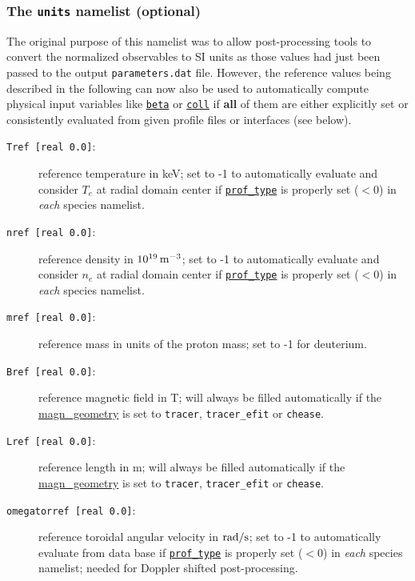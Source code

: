 \documentclass[12pt]{article}
\begin{document}
\subsubsection{{The \texttt{units} namelist (optional)}}\label{sec:units_nml}
\hypertarget{units_nml}{}
The original purpose of this namelist was to allow post-processing tools to convert the normalized observables
to SI units as those values had just been passed to the output \texttt{parameters.dat} file.
However, the reference values being described in the following can now also be used to automatically
compute physical input variables like \hyperlink{beta}{\tt beta} or \hyperlink{coll}{\tt coll} if {\bf all} of them
are either explicitly set or consistently evaluated from given profile files or interfaces (see below).
\begin{description}
\item[\texttt{Tref [real 0.0]}:] reference temperature in keV; set to -1 to automatically evaluate and consider $T_e$
at radial domain center if \hyperlink{prof_type}{\tt prof\_type} is properly set ($<0$) in {\em each} species namelist.
\item[\texttt{nref [real 0.0]}:] reference density in $10^{19}\,{\rm m}^{-3}$; set to -1 to automatically evaluate and
consider $n_e$ at radial domain center if \hyperlink{prof_type}{\tt prof\_type} is properly set ($<0$) in {\em each} species namelist.
\item[\texttt{mref [real 0.0]}:] reference mass in units of the proton mass; set to -1 for deuterium.
\item[\texttt{Bref [real 0.0]}:] reference magnetic field in T; will always be filled automatically if the
\hyperlink{magn_geometry}{magn\_geometry} is set to \texttt{tracer}, \texttt{tracer\_efit} or \texttt{chease}.
\item[\texttt{Lref [real 0.0]}:] reference length in m; will always be filled automatically if the
\hyperlink{magn_geometry}{magn\_geometry} is set to \texttt{tracer}, \texttt{tracer\_efit} or \texttt{chease}.
\item[\hypertarget{omegatorref}{\texttt{omegatorref [real 0.0]}}:] reference toroidal angular velocity in ${\rm rad}/{\rm s}$;
set to -1 to automatically evaluate from data base if \hyperlink{prof_type}{\tt prof\_type} is properly set ($<0$) in {\em each}
species namelist; needed for Doppler shifted post-processing.
\end{description}
%
\end{document}
